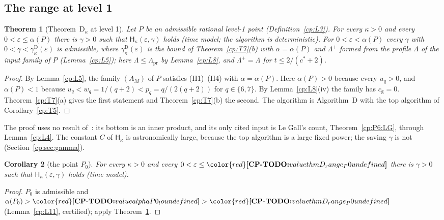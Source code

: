 \documentclass[11pt]{article}
\makeatletter
\newtheorem{theorem}{Theorem}[section]
\newtheorem{corollary}[theorem]{Corollary}
\theoremstyle{definition}
\theoremstyle{remark}
\DeclareRobustCommand{\CPTODO}[1]{{\color{red}\textbf{[CP-TODO:} #1\textbf{]}}}
\providecommand{\eps}{\varepsilon}
\newcommand{\Hypk}[1]{\mathsf{H}_{#1}}        %
\newcommand{\Lam}{\Lambda}                    %
\newcommand{\Lamp}{\Lambda^{+}}               %
\newcommand{\Lampr}{\Lambda_{\mathrm{pr}}}    %
\newcommand{\cg}{c_{\mathrm g}}               %
\newcommand{\cstar}{c^{*}}                    %
\newcommand{\Hcond}[1]{\textup{(H#1)}}        %
\newcommand{\ThmDk}{Theorem~D\texorpdfstring{\ensuremath{_\kappa}}{\_kappa}}     %
\newcommand{\AlgD}{Algorithm~D}                             %
\newcommand{\gbound}[2]{\gamma^{#1}_{#2}}     %
\newcommand{\Pzero}{P_0}                      %
\newcommand{\cpv}[1]{\ifcsname cpv@#1\endcsname\csname cpv@#1\endcsname\else\CPTODO{value #1 undefined}\fi}
\makeatother
\begin{document}
\subsection{The range at level 1}\label{cp:sec:range-level1}

\begin{theorem}[\ThmDk{} at level 1]\label{cp:A1}
Let $P$ be an admissible rational level-1 point (Definition~\ref{cp:L3}). For every $\kappa>0$ and every $0<\eps\le\alpha(P)$ there is $\gamma>0$ such that $\Hypk\kappa(\eps,\gamma)$ holds (time model; the algorithm is deterministic). For $0<\eps<\alpha(P)$ every $\gamma$ with $0<\gamma<\gbound{\mathrm D}\kappa(\eps)$ is admissible, where $\gbound{\mathrm D}\kappa(\eps)$ is the bound of Theorem~\ref{cp:T7}(b) with $\alpha=\alpha(P)$ and $\Lamp$ formed from the profile $\Lam$ of the input family of $P$ (Lemma~\ref{cp:L5}); here $\Lam\le\Lampr$ by Lemma~\ref{cp:L8}, and $\Lamp=\Lam$ for $t\le2/(\cstar+2)$.
\end{theorem}

\begin{proof}
By Lemma~\ref{cp:L5}, the family $(A_M)$ of $P$ satisfies \Hcond1--\Hcond4{} with $\alpha=\alpha(P)$. Here $\alpha(P)>0$ because every $u_q>0$, and $\alpha(P)<1$ because $u_q<w_q=1/(q+2)<p_q=q/(2(q+2))$ for $q\in\{6,7\}$. By Lemma~\ref{cp:L8}(iv) the family has $\cg=0$. Theorem~\ref{cp:T7}(a) gives the first statement and Theorem~\ref{cp:T7}(b) the second. The algorithm is \AlgD{} with the top algorithm of Corollary~\ref{cp:T5}.
\end{proof}

The proof uses no result of~\cite{v2}: its bottom is an inner product, and its only cited input is Le Gall's count, Theorem~\ref{cp:P6:LG}, through Lemma~\ref{cp:L4}. The constant $C$ of $\Hypk\kappa$ is astronomically large, because the top algorithm is a large fixed power; the saving $\gamma$ is not (Section~\ref{cp:sec:gamma}).

\begin{corollary}[the point $\Pzero$]\label{cp:A2}
For every $\kappa>0$ and every $0<\eps\le\cpv{thmD_range_P0}$ there is $\gamma>0$ such that $\Hypk\kappa(\eps,\gamma)$ holds (time model).
\end{corollary}

\begin{proof}
$\Pzero$ is admissible and $\alpha(\Pzero)>\cpv{alphaP0_lo}>\cpv{thmD_range_P0}$ (Lemma~\ref{cp:L11}, certified); apply Theorem~\ref{cp:A1}.
\end{proof}
\end{document}
